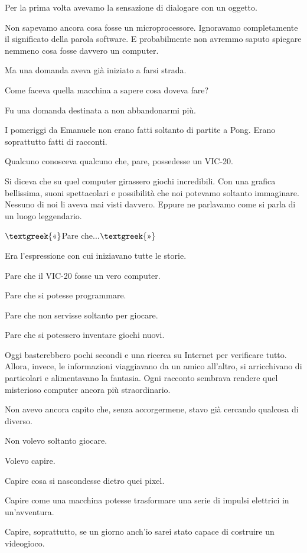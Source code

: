 \documentclass{article}
\begin{document}
Per la prima volta avevamo la sensazione di dialogare con un oggetto.

Non sapevamo ancora cosa fosse un microprocessore. Ignoravamo completamente il significato della parola software. E
probabilmente non avremmo saputo spiegare nemmeno cosa fosse davvero un computer.

Ma una domanda aveva già iniziato a farsi strada.

Come faceva quella macchina a sapere cosa doveva fare?

Fu una domanda destinata a non abbandonarmi più.

I pomeriggi da Emanuele non erano fatti soltanto di partite a Pong. Erano soprattutto fatti di racconti.

Qualcuno conosceva qualcuno che, pare, possedesse un VIC-20.

Si diceva che su quel computer girassero giochi incredibili. Con una grafica bellissima, suoni spettacolari e
possibilità che noi potevamo soltanto immaginare. Nessuno di noi li aveva mai visti davvero. Eppure ne parlavamo come
si parla di un luogo leggendario.

$\text{\textgreek{«}}$Pare che...$\text{\textgreek{»}}$

Era l'espressione con cui iniziavano tutte le storie.

Pare che il VIC-20 fosse un vero computer.

Pare che si potesse programmare.

Pare che non servisse soltanto per giocare.

Pare che si potessero inventare giochi nuovi.

Oggi basterebbero pochi secondi e una ricerca su Internet per verificare tutto. Allora, invece, le informazioni
viaggiavano da un amico all'altro, si arricchivano di particolari e alimentavano la fantasia. Ogni racconto sembrava
rendere quel misterioso computer ancora più straordinario.

Non avevo ancora capito che, senza accorgermene, stavo già cercando qualcosa di diverso.

Non volevo soltanto giocare.

Volevo capire.

Capire cosa si nascondesse dietro quei pixel.

Capire come una macchina potesse trasformare una serie di impulsi elettrici in un'avventura.

Capire, soprattutto, se un giorno anch'io sarei stato capace di costruire un videogioco.
\end{document}
